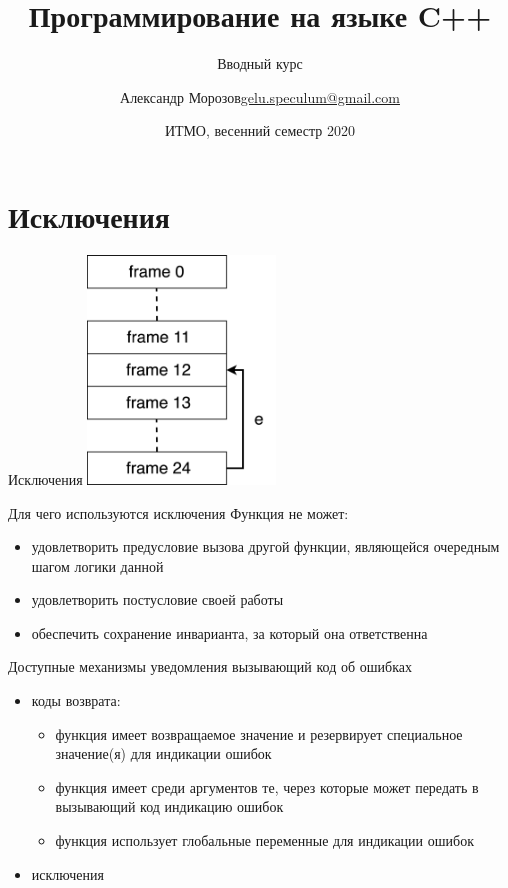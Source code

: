 \documentclass[unknownkeysallowed,xcolor=table]{beamer}
\title[C++]
{Программирование на языке C++}
\subtitle{Вводный курс}
\author[А.~Б.~Морозов]
{
  \texorpdfstring{Александр Морозов\newline\href{mailto:gelu.speculum@gmail.com}{gelu.speculum@gmail.com}}
  {Александр Морозов}
}
\date[ITMO 2020]
{ИТМО, весенний семестр 2020}
\begin{document}
\frame{\titlepage}


\section{Исключения}

\begin{frame}{Исключения}
    \center
    \includegraphics[align=c,width=5cm,keepaspectratio]{images/exception.png}
\end{frame}

\begin{frame}{Для чего используются исключения}
  Функция не может:
  \begin{itemize}
    \item удовлетворить предусловие вызова другой функции, являющейся очередным шагом логики данной \vspace{1em}
    \item удовлетворить постусловие своей работы \vspace{1em}
    \item обеспечить сохранение инварианта, за который она ответственна
  \end{itemize}
\end{frame}

\begin{frame}{Доступные механизмы уведомления вызывающий код об ошибках}
  \begin{itemize}
    \item коды возврата:
      \begin{itemize}
        \item функция имеет возвращаемое значение и резервирует специальное значение(я) для индикации ошибок \vspace{0.5em}
        \item функция имеет среди аргументов те, через которые может передать в вызывающий код индикацию ошибок \vspace{0.5em}
        \item функция использует глобальные переменные для индикации ошибок \vspace{1em}
      \end{itemize}
    \item исключения
  \end{itemize}
\end{frame}
\end{document}
